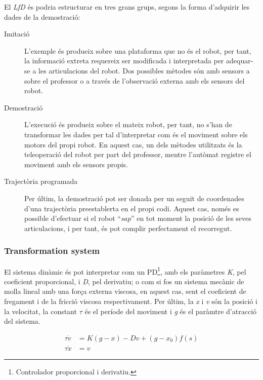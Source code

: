 \documentclass[12pt,a4paper,final,twoside]{report}
\begin{document}
El \textit{LfD} és podria estructurar en tres grans grups, segons la forma d'adquirir les dades de la demostració:
\begin{description}

\item[Imitació] L'exemple és produeix sobre una plataforma que no és el robot, per tant, la informació extreta requereix ser modificada i interpretada per adequar-se a les articulacions del robot. Dos possibles mètodes són amb sensors a sobre el professor o a través de l'observació externa amb els sensors del robot.

\item[Demostració] L'execució és produeix sobre el mateix robot, per tant, no s'han de transformar les dades per tal d'interpretar com és el moviment sobre els motors del propi robot. En aquest cas, un dels mètodes utilitzats és la teleoperació del robot per part del professor, mentre l'autòmat registre el moviment amb els sensors propis.

\item[Trajectòria programada] Per últim, la demostració pot ser donada per un seguit de coordenades d'una trajectòria preestablerta en el propi codi. Aquest cas, només es possible d'efectuar si el robot ``\textit{sap}'' en tot moment la posició de les seves articulacions, i per tant, és pot complir perfectament el recorregut. 

\end{description}

\subsubsection{Transformation system}

El sistema dinàmic és pot interpretar com un PD\footnote{Controlador proporcional i derivatiu.}, amb els paràmetres \textit{K}, pel coeficient proporcional, i \textit{D}, pel derivatiu; o com si fos un sistema mecànic de molla lineal amb una força externa viscosa, en aquest cas, sent el coeficient de fregament i de la fricció viscosa respectivament. Per últim, la \textit{x} i \textit{v} són la posició i la velocitat, la constant $\tau$ és el període del moviment i \textit{g} és el paràmtre d'atracció del sistema.

\begin{align}
\tau \dot{v} &= K(g - x) - Dv + (g - x_0)f(s)\label{eq:tau-v-dot-DMP}\\
\tau \dot{x} &= v\label{eq:tau-x-dot=v}
\end{align}
\end{document}
